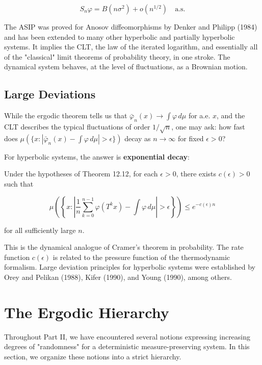 \[
S_n \varphi = B(n\sigma^2) + o(n^{1/2}) \quad \text{a.s.}
\]

The ASIP was proved for Anosov diffeomorphisms by Denker and Philipp (1984) and has been extended to many other hyperbolic and partially hyperbolic systems. It implies the CLT, the law of the iterated logarithm, and essentially all of the "classical" limit theorems of probability theory, in one stroke. The dynamical system behaves, at the level of fluctuations, as a Brownian motion.


\subsection{Large Deviations}\label{sec:12.3.4}

While the ergodic theorem tells us that $\bar{\varphi}_n(x) \to \int \varphi \, d\mu$ for a.e. $x$, and the CLT describes the typical fluctuations of order $1/\sqrt{n}$, one may ask: how fast does $\mu(\{x : |\bar{\varphi}_n(x) - \int \varphi \, d\mu| > \epsilon\})$ decay as $n \to \infty$ for fixed $\epsilon > 0$?

For hyperbolic systems, the answer is \textbf{exponential decay}:

\begin{theorem}\label{thm:12.14}
Under the hypotheses of Theorem 12.12, for each $\epsilon > 0$, there exists $c(\epsilon) > 0$ such that

\[
\mu\left(\left\{x : \left|\frac{1}{n}\sum_{k=0}^{n-1}\varphi(T^k x) - \int \varphi \, d\mu\right| > \epsilon\right\}\right) \leq e^{-c(\epsilon) n}
\]

for all sufficiently large $n$.

This is the dynamical analogue of Cramer's theorem in probability. The rate function $c(\epsilon)$ is related to the pressure function of the thermodynamic formalism. Large deviation principles for hyperbolic systems were established by Orey and Pelikan (1988), Kifer (1990), and Young (1990), among others.
\end{theorem}


\section{The Ergodic Hierarchy}\label{sec:12.4}

Throughout Part II, we have encountered several notions expressing increasing degrees of "randomness" for a deterministic measure-preserving system. In this section, we organize these notions into a strict hierarchy.


